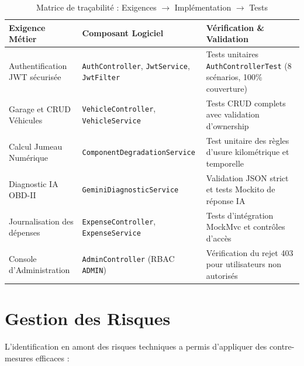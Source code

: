 \documentclass[12pt,a4paper,oneside]{report}
\begin{document}
\begin{table}[H]
\centering
\small
\begin{tabularx}{\textwidth}{p{3.5cm} p{3.8cm} X}
\toprule
\textbf{Exigence M\'etier} & \textbf{Composant Logiciel} & \textbf{V\'erification \& Validation} \\
\midrule
Authentification JWT s\'ecuris\'ee & \texttt{AuthController}, \texttt{JwtService}, \texttt{JwtFilter} & Tests unitaires \texttt{AuthControllerTest} (8 sc\'enarios, 100\% couverture) \\
\addlinespace
Garage et CRUD V\'ehicules & \texttt{VehicleController}, \texttt{VehicleService} & Tests CRUD complets avec validation d'ownership \\
\addlinespace
Calcul Jumeau Num\'erique & \texttt{ComponentDegradationService} & Test unitaire des r\`egles d'usure kilom\'etrique et temporelle \\
\addlinespace
Diagnostic IA OBD-II & \texttt{GeminiDiagnosticService} & Validation JSON strict et tests Mockito de r\'eponse IA \\
\addlinespace
Journalisation des d\'epenses & \texttt{ExpenseController}, \texttt{ExpenseService} & Tests d'int\'egration MockMvc et contr\^oles d'acc\`es \\
\addlinespace
Console d'Administration & \texttt{AdminController} (RBAC \texttt{ADMIN}) & V\'erification du rejet 403 pour utilisateurs non autoris\'es \\
\bottomrule
\end{tabularx}
\caption{Matrice de tra\c{c}abilit\'e : Exigences $\rightarrow$ Impl\'ementation $\rightarrow$ Tests}
\label{tab:tracabilite_ch2}
\end{table}

\section{Gestion des Risques}
L'identification en amont des risques techniques a permis d'appliquer des contre-mesures efficaces :
\end{document}
